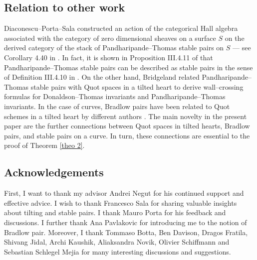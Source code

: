 \documentclass[11pt]{article}
\begin{document}


\subsection{Relation to other work}
Diaconescu--Porta--Sala constructed an action of the categorical Hall algebra associated with the category of zero dimensional sheaves on a surface $S$ on the derived category of the stack of Pandharipande--Thomas stable pairs on $S$ \cite{Pandharipande_2009} --- see Corollary 4.40 in \cite{dps}. In fact, it is shown in Proposition III.4.11 of \cite{dps} that Pandharipande--Thomas stable pairs can be described as stable pairs in the sense of Definition III.4.10 in \cite{dps}. On the other hand, Bridgeland \cite{bridgeland2020hallalgebrascurvecountinginvariants} related Pandharipande--Thomas stable pairs with Quot spaces in a tilted heart to derive wall--crossing formulas for Donaldson--Thomas invariants and Pandharipande--Thomas invariants. In the case of curves, Bradlow pairs have been related to Quot schemes in a tilted heart by different authors \cite{Rota_2021} \cite{10.4134/JKMS.J230331}. The main novelty in the present paper are the further connections between Quot spaces in tilted hearts, Bradlow pairs, and stable pairs on a curve. In turn, these connections are essential to the proof of Theorem \ref{theo 2}.


\subsection{Acknowledgements}
First, I want to thank my advisor Andrei Negut for his continued support and effective advice. I wish to thank Francesco Sala for sharing valuable insights about tilting and stable pairs. I thank Mauro Porta for his feedback and discussions. I further thank Ana Pavlakovic for introducing me to the notion of Bradlow pair. Moreover, I thank Tommaso Botta, Ben Davison, Dragos Fratila, Shivang Jidal, Archi Kaushik, Aliaksandra Novik, Olivier Schiffmann and 
Sebastian Schlegel Mejia for many interesting discussions and suggestions.
\end{document}

